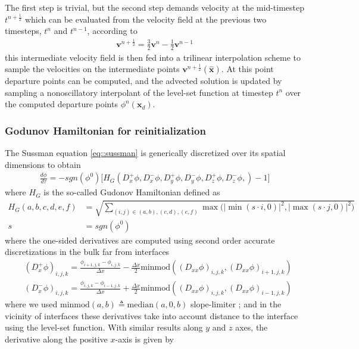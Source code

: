 \documentclass{elsarticle}
\begin{document}
The first step is trivial, but the second step demands velocity at the mid-timestep $t^{n + \frac{1}{2}}$ which can be evaluated from the velocity field at the previous two timesteps, $t^n$ and $t^{n-1}$, according to
\begin{align*}
	\mathbf{v}^{n+\frac{1}{2}} = \frac{3}{2}\mathbf{v}^n - \frac{1}{2} \mathbf{v}^{n-1}
\end{align*}
this intermediate velocity field is then fed into a trilinear interpolation scheme to sample the velocities on the intermediate points $\mathbf{v}^{n+\frac{1}{2}}(\hat{\mathbf{x}})$. At this point departure points can be computed, and the advected solution is updated by sampling a nonoscillatory interpolant of the level-set function at timestep $t^n$ over the computed departure points $\phi^n(\mathbf{x}_d)$.


\subsubsection{Godunov Hamiltonian for reinitialization}
The Sussman equation \ref{eq::sussman} is generically discretized over its spatial dimensions to obtain
\begin{align}
	\frac{d\phi}{d\tau} = -sgn(\phi^0) \bigg[ H_G(D_x^+\phi, D_x^-\phi, D_y^+\phi, D_y^-\phi, D_z^+\phi, D_z^-\phi, ) - 1 \bigg]
\end{align}
where $H_G$ is the so-called Gudonov Hamiltonian defined as
\begin{align*}
	H_G(a,b,c,d,e,f) &= \sqrt{ \sum_{(i,j)\in (a,b),(c,d),(e,f)}\max\bigg( \vert\min( s\cdot i,0)\vert^2, \vert\max( s\cdot j,0)\vert^2 \bigg)  }\\
	s&= sgn(\phi^0)
\end{align*}
where the one-sided derivatives are computed using second order accurate discretizations in the bulk far from interfaces
\begin{align*}
	&(D_x^+\phi)_{i,j,k} = \frac{\phi_{i+1,j,k} - \phi_{i,j,k}}{\Delta x} - \frac{\Delta x}{2} \textrm{minmod}((D_{xx}\phi)_{i,j,k}, (D_{xx}\phi)_{i+1,j,k})\\
	&(D_x^-\phi)_{i,j,k} = \frac{\phi_{i,j,k} - \phi_{i-1,j,k}}{\Delta x} + \frac{\Delta x}{2} \textrm{minmod}((D_{xx}\phi)_{i,j,k}, (D_{xx}\phi)_{i-1,j,k})
\end{align*}
where we used $\textrm{minmod}(a,b)\triangleq \textrm{median}(a,0,b)$ slope-limiter \cite{shu1988efficient}; and in the vicinity of interfaces these derivatives take into account distance to the interface using the level-set function. With similar results along $y$ and $z$ axes, the derivative along the positive $x$-axis is given by 
\end{document}
